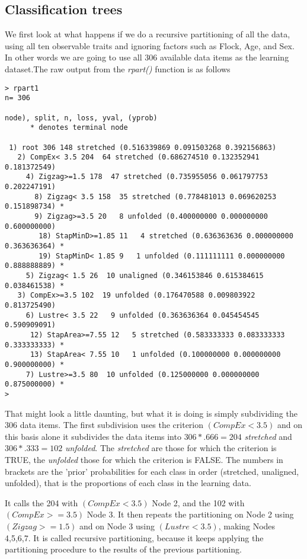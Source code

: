 \documentclass[titlepage]{article}  %
\begin{document}
\subsection{Classification trees}
We first look at what happens if we do a recursive partitioning of all the data, using all ten observable traits and ignoring factors such as Flock, Age, and Sex. In other words we are going to use all 306 available data items as the learning dataset.The raw output from the {\em rpart()} function is as follows
\begin{verbatim}
> rpart1
n= 306 

node), split, n, loss, yval, (yprob)
      * denotes terminal node

 1) root 306 148 stretched (0.516339869 0.091503268 0.392156863)  
   2) CompEx< 3.5 204  64 stretched (0.686274510 0.132352941 0.181372549)  
     4) Zigzag>=1.5 178  47 stretched (0.735955056 0.061797753 0.202247191)  
       8) Zigzag< 3.5 158  35 stretched (0.778481013 0.069620253 0.151898734) *
       9) Zigzag>=3.5 20   8 unfolded (0.400000000 0.000000000 0.600000000)  
        18) StapMinD>=1.85 11   4 stretched (0.636363636 0.000000000 0.363636364) *
        19) StapMinD< 1.85 9   1 unfolded (0.111111111 0.000000000 0.888888889) *
     5) Zigzag< 1.5 26  10 unaligned (0.346153846 0.615384615 0.038461538) *
   3) CompEx>=3.5 102  19 unfolded (0.176470588 0.009803922 0.813725490)  
     6) Lustre< 3.5 22   9 unfolded (0.363636364 0.045454545 0.590909091)  
      12) StapArea>=7.55 12   5 stretched (0.583333333 0.083333333 0.333333333) *
      13) StapArea< 7.55 10   1 unfolded (0.100000000 0.000000000 0.900000000) *
     7) Lustre>=3.5 80  10 unfolded (0.125000000 0.000000000 0.875000000) *
> 
\end{verbatim}
	That might look a little daunting, but what it is doing is simply subdividing the 306 data items. The first subdivision uses the criterion $(CompEx < 3.5)$ and on this basis alone it subdivides the data items into $306 * .666 = 204$ {\em stretched} and $306 * .333 = 102$ {\em unfolded}. The {\em stretched} are those for which the criterion is TRUE, the {\em unfolded} those for which the criterion is FALSE. The numbers in brackets are the 'prior' probabilities for each class in order (stretched, unaligned, unfolded), that is the proportions of each class in the learning data.

	It calls the 204 with $(CompEx < 3.5)$ Node 2, and the 102 with $(CompEx >= 3.5)$ Node 3. It then repeats the partitioning on Node 2 using $(Zigzag>=1.5)$ and on Node 3 using $(Lustre< 3.5)$, making Nodes 4,5,6,7.  It is called recursive partitioning, because it keeps applying the partitioning procedure to the results of the previous partitioning.
\end{document}
